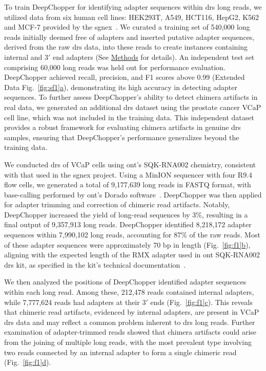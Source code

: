 \documentclass[pdflatex,sn-nature, lineno]{sn-jnl}%
\newcommand{\figref}[2]{Fig.~\hyperref[#1]{\ref*{#1}#2}}
\newcommand{\edfigref}[2]{Extended Data Fig.~\hyperref[#1]{\ref*{#1}#2}}
\begin{document}
To train DeepChopper for identifying adapter sequences within \gls{drs} long reads, we utilized data from six human cell lines: HEK293T, A549, HCT116, HepG2, K562 and MCF-7 provided by the \gls{sgnex}~\cite{chen2021systematic}.
We curated a training set of 540,000 long reads initially deemed free of adapters and inserted putative adapter sequences, derived from the raw \gls{drs} data, into these reads to create instances containing internal and $3'$ end adapters (See \hyperref[sec:methods]{Methods} for details).
An independent test set comprising 60,000 long reads was held out for performance evaluation.
DeepChopper achieved recall, precision, and F1 scores above 0.99 (\edfigref{fig:sf1}{a}), demonstrating its high accuracy in detecting adapter sequences.
To further assess DeepChopper’s ability to detect chimera artifacts in real data, we generated an additional \gls{drs} dataset using the prostate cancer VCaP cell line, which was not included in the training data.
This independent dataset provides a robust framework for evaluating chimera artifacts in genuine \gls{drs} samples, ensuring that DeepChopper's performance generalizes beyond the training data.

We conducted \gls{drs} of VCaP cells using \gls{ont}'s SQK-RNA002 chemistry, consistent with that used in the \gls{sgnex} project.
Using a MinION sequencer with four R9.4 flow cells, we generated a total of 9,177,639 long reads in FASTQ format, with base-calling performed by \gls{ont}'s Dorado software~\cite{dorado2023}.
DeepChopper was then applied for adapter trimming and correction of chimeric read artifacts.
Notably, DeepChopper increased the yield of long-read sequences by 3\%, resulting in a final output of 9,357,913 long reads.
DeepChopper identified 8,218,172 adapter sequences within 7,990,102 long reads, accounting for 87\% of the raw reads.
Most of these adapter sequences were approximately 70 bp in length (\figref{fig:f1}{b}), aligning with the expected length of the RMX adapter used in \gls{ont} SQK-RNA002 \gls{drs} kit, as specified in the kit's technical documentation~\cite{nano2017tech}.

We then analyzed the positions of DeepChopper identified adapter sequences within each long read.
Among these, 212,478 reads contained internal adapters, while 7,777,624 reads had adapters at their $3'$ ends (\figref{fig:f1}{c}).
This reveals that chimeric read artifacts, evidenced by internal adapters, are present in VCaP \gls{drs} data and may reflect a common problem inherent to \gls{drs} long reads.
Further examination of adapter-trimmed reads showed that chimera artifacts could arise from the joining of multiple long reads, with the most prevalent type involving two reads connected by an internal adapter to form a single chimeric read (\figref{fig:f1}{d}).
\end{document}

